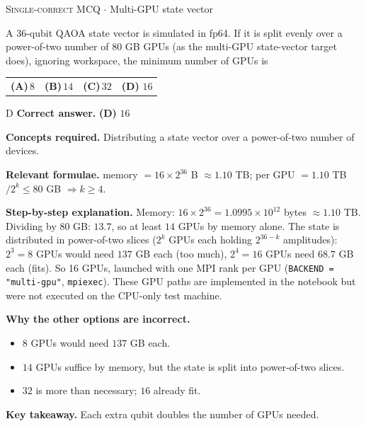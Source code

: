 \documentclass[11pt,a4paper]{article}
\newcommand{\optlabel}[1]{\textbf{(#1)}}
\newcommand{\correctlabel}[1]{\textcolor{okgreen}{\textbf{(#1)}\,\ding{51}}}
\newenvironment{qitem}[1]{\begin{list}{}{\setlength{\leftmargin}{3.3em}\setlength{\labelwidth}{3.1em}%
  \setlength{\labelsep}{0.2em}\setlength{\topsep}{3pt}\setlength{\parsep}{3pt}}\item[\textbf{Q.#1}\hfill]}{\end{list}}
\newcommand{\qsep}{\par\vspace{2pt}{\color{black!15}\hrule}\vspace{4pt}}
\newcommand{\qmeta}[2]{{\footnotesize\color{black!60}\textsc{#1} \;$\cdot$\; #2}\par}
\begin{document}
\begin{qitem}{67}
\qmeta{Single-correct MCQ}{Multi-GPU state vector}
A 36-qubit QAOA state vector is simulated in fp64. If it is split evenly over a power-of-two number of 80 GB GPUs (as the
multi-GPU state-vector target does), ignoring workspace, the minimum number of GPUs is
\par\smallskip\noindent\begin{tabularx}{\linewidth}{@{}*{4}{L}@{}}
\optlabel{A}\,$8$ & \optlabel{B}\,$14$ & \optlabel{C}\,$32$ & \correctlabel{D}\,$16$
\end{tabularx}
\end{qitem}
\begin{solbox}{D}
\textbf{\color{brand}Correct answer.} \textcolor{okgreen}{\textbf{(D)}} $16$

\textbf{\color{brand}Concepts required.} Distributing a state vector over a power-of-two number of devices.

\textbf{\color{brand}Relevant formulae.} memory $= 16\times2^{36}$ B $\approx 1.10$ TB; per GPU $= 1.10$ TB$/2^k \le 80$ GB $\Rightarrow k \ge 4$.

\textbf{\color{brand}Step-by-step explanation.} Memory: $16\times2^{36} = 1.0995\times10^{12}$ bytes $\approx 1.10$ TB. Dividing by $80$ GB: $13.7$, so at least $14$ GPUs by memory
alone. The state is distributed in power-of-two slices ($2^k$ GPUs each holding $2^{36-k}$ amplitudes): $2^3 = 8$ GPUs would need
$137$ GB each (too much), $2^4 = 16$ GPUs need $68.7$ GB each (fits). So 16 GPUs, launched with one MPI rank per GPU
(\texttt{BACKEND = "multi-gpu"}, \texttt{mpiexec}). These GPU paths are implemented in the notebook but were not executed on the
CPU-only test machine.

\textbf{\color{brand}Why the other options are incorrect.}
\begin{itemize}[leftmargin=2.4em, itemsep=1pt, topsep=2pt]
\item[\textbf{(A)}] $8$ GPUs would need $137$ GB each.
\item[\textbf{(B)}] $14$ GPUs suffice by memory, but the state is split into power-of-two slices.
\item[\textbf{(C)}] $32$ is more than necessary; $16$ already fit.
\end{itemize}
\textbf{\color{brand}Key takeaway.} Each extra qubit doubles the number of GPUs needed.
\end{solbox}
\qsep
\end{document}
